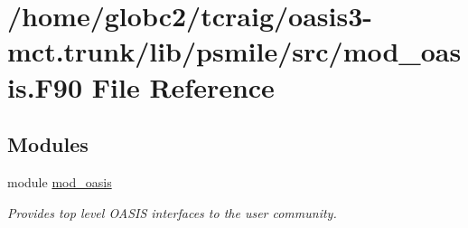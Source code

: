 \hypertarget{mod__oasis_8_f90}{}\section{/home/globc2/tcraig/oasis3-\/mct.trunk/lib/psmile/src/mod\+\_\+oasis.F90 File Reference}
\label{mod__oasis_8_f90}
\subsection*{Modules}
\begin{DoxyCompactItemize}
\item 
module \hyperlink{namespacemod__oasis}{mod\+\_\+oasis}
\begin{DoxyCompactList}\small\item\em Provides top level O\+A\+S\+IS interfaces to the user community. \end{DoxyCompactList}\end{DoxyCompactItemize}
